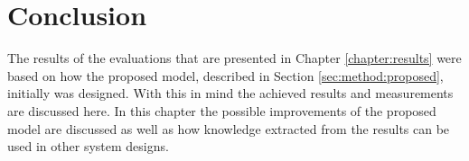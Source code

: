\chapter{Conclusion}
\label{chapter:conclusion}
The results of the evaluations that are presented in Chapter \ref{chapter:results} were based on how the proposed model, described in Section \ref{sec:method:proposed}, initially was designed. With this in mind the achieved results and measurements are discussed here. In this chapter the possible improvements of the proposed model are discussed as well as how knowledge extracted from the results can be used in other system designs.



